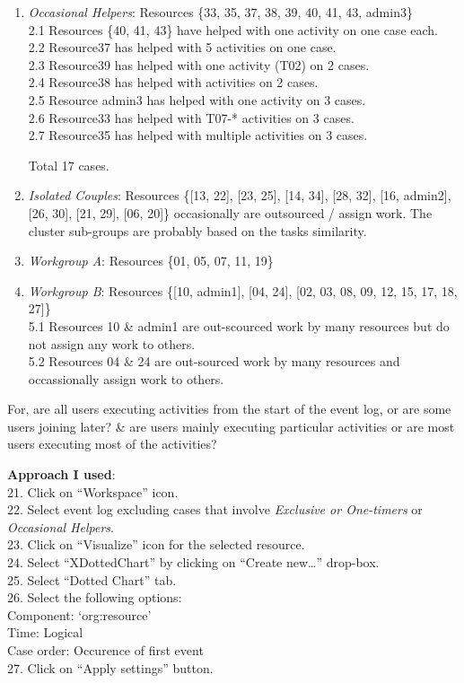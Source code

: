 \documentclass[]{article}
\begin{document}
\begin{enumerate}
\def\labelenumi{\arabic{enumi}.}
\setcounter{enumi}{1}
\item
  \emph{Occasional Helpers}: Resources \{33, 35, 37, 38, 39, 40, 41, 43,
  admin3\}\\2.1 Resources \{40, 41, 43\} have helped with one activity
  on one case each.\\2.2 Resource37 has helped with 5 activities on one
  case.\\2.3 Resource39 has helped with one activity (T02) on 2
  cases.\\2.4 Resource38 has helped with activities on 2 cases.\\2.5
  Resource admin3 has helped with one activity on 3 cases.\\2.6
  Resource33 has helped with T07-* activities on 3 cases.\\2.7
  Resource35 has helped with multiple activities on 3 cases.

  Total 17 cases.
\item
  \emph{Isolated Couples}: Resources \{{[}13, 22{]}, {[}23, 25{]},
  {[}14, 34{]}, {[}28, 32{]}, {[}16, admin2{]}, {[}26, 30{]}, {[}21,
  29{]}, {[}06, 20{]}\} occasionally are outsourced / assign work. The
  cluster sub-groups are probably based on the tasks similarity.
\item
  \emph{Workgroup A}: Resources \{01, 05, 07, 11, 19\}
\item
  \emph{Workgroup B}: Resources \{{[}10, admin1{]}, {[}04, 24{]}, {[}02,
  03, 08, 09, 12, 15, 17, 18, 27{]}\}\\5.1 Resources 10 \& admin1 are
  out-scourced work by many resources but do not assign any work to
  others.\\5.2 Resources 04 \& 24 are out-sourced work by many resources
  and occassionally assign work to others.
\end{enumerate}

For, are all users executing activities from the start of the event log,
or are some users joining later? \& are users mainly executing
particular activities or are most users executing most of the
activities?

\textbf{Approach I used}:\\21. Click on ``Workspace'' icon.\\22. Select
event log excluding cases that involve \emph{Exclusive or One-timers} or
\emph{Occasional Helpers}.\\23. Click on ``Visualize'' icon for the
selected resource.\\24. Select ``XDottedChart'' by clicking on ``Create
new\ldots{}'' drop-box.\\25. Select ``Dotted Chart'' tab.\\26. Select
the following options:\\ Component: `org:resource'\\ Time: Logical\\
Case order: Occurence of first event\\27. Click on ``Apply settings''
button.
\end{document}
